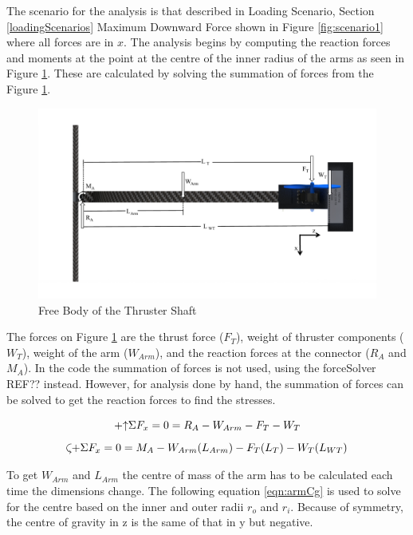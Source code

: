 \documentclass[../main.tex]{subfiles}
\begin{document}
The scenario for the analysis is that described in Loading Scenario, Section \ref{loadingScenarios} Maximum Downward Force shown in Figure \ref{fig:scenario1} where all forces are in $x$. The analysis begins by computing the reaction forces and moments at the point at the centre of the inner radius of the arms as seen in Figure \ref{fig:thrusterArmFBD}. These are calculated by solving the summation of forces from the Figure \ref{fig:thrusterArmFBD}.

\begin{figure}[H]
	\centering
	\includegraphics[width=.9\linewidth]{img/analysis/arm/thrusterArm.pdf}
	\caption{Free Body of the Thruster Shaft}
	\label{fig:thrusterArmFBD}
\end{figure}

The forces on Figure \ref{fig:thrusterArmFBD} are the thrust force ($F_T$), weight of thruster components ($W_T$), weight of the arm ($W_{Arm}$), and the reaction forces at the connector ($R_A$ and $M_A$). In the code the summation of forces is not used, using the forceSolver REF?? instead. However, for analysis done by hand, the summation of forces can be solved to get the reaction forces to find the stresses.

\begin{equation} \label{eqn:armFx}
\mathbin{+\mathord\uparrow} \Sigma F_x = 0 = R_A - W_{Arm} - F_T - W_T
\end{equation}
\begin{equation} \label{eqn:armMA}
\curveplus \Sigma F_x = 0 = M_A - W_{Arm}(L_{Arm}) - F_T(L_T) - W_T(L_{WT})
\end{equation}

To get $W_{Arm}$ and $L_{Arm}$ the centre of mass of the arm has to be calculated each time the dimensions change. The following equation \ref{eqn:armCg} is used to solve for the centre based on the inner and outer radii $r_o$ and $r_i$. Because of symmetry, the centre of gravity in z is the same of that in y but negative. 
\end{document}
